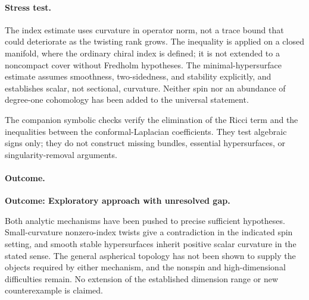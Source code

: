 \documentclass[11pt,a4paper]{article}
\numberwithin{equation}{section}
\begin{document}
\paragraph{Stress test.}
The index estimate uses curvature in operator norm, not a trace bound
that could deteriorate as the twisting rank grows.  The inequality is
applied on a closed manifold, where the ordinary chiral index is defined;
it is not extended to a noncompact cover without Fredholm hypotheses.
The minimal-hypersurface estimate assumes smoothness, two-sidedness,
and stability explicitly, and establishes scalar, not sectional,
curvature.  Neither spin nor an abundance of degree-one cohomology has
been added to the universal statement.

The companion symbolic checks verify the elimination of the Ricci term
and the inequalities between the conformal-Laplacian coefficients.
They test algebraic signs only; they do not construct missing bundles,
essential hypersurfaces, or singularity-removal arguments.

\paragraph{Outcome.}
\textbf{Outcome: Exploratory approach with unresolved gap.}

Both analytic mechanisms have been pushed to precise sufficient
hypotheses.  Small-curvature nonzero-index twists give a contradiction
in the indicated spin setting, and smooth stable hypersurfaces inherit
positive scalar curvature in the stated sense.  The general aspherical
topology has not been shown to supply the objects required by either
mechanism, and the nonspin and high-dimensional difficulties remain.
No extension of the established dimension range or new counterexample
is claimed.
\end{document}
